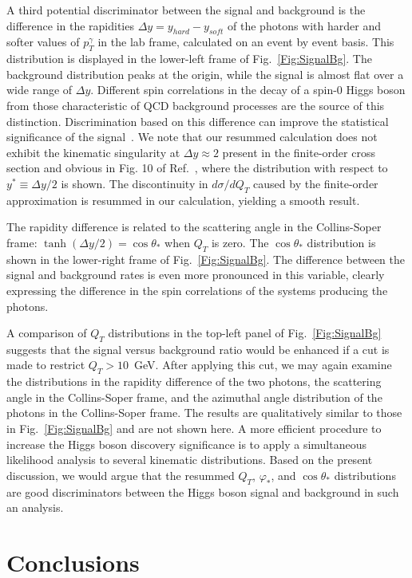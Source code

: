 \documentclass[12pt,english,aps,preprint,prd,letterpaper,fleqn,nofootinbib,showpacs,showkeys,tightenlines,floatfix]{revtex4}
\begin{document}
{A third potential discriminator between the signal and background
is the difference in the rapidities $\Delta y=y_{hard}-y_{soft}$
of the photons with harder and softer values of $p_{T}^{\gamma}$
in the lab frame, calculated on an event by event basis. This distribution
is displayed in the lower-left frame of Fig.~\ref{Fig:SignalBg}.
The background distribution peaks at the origin, while the signal
is almost flat over a wide range of $\Delta y$. Different spin correlations
in the decay of a spin-0 Higgs boson from those characteristic of
QCD background processes are the source of this distinction. Discrimination
based on this difference can improve the statistical significance
of the signal~\cite{Bern:2002jx}. We note that our resummed calculation
does not exhibit the kinematic singularity at $\Delta y\approx2$
present in the finite-order cross section and obvious in Fig. 10 
of Ref.~\cite{Bern:2002jx}, where the distribution with respect to
$y^*\equiv\Delta y/2$ is shown. The
discontinuity in $d\sigma/dQ_{T}$ caused by the finite-order approximation
is resummed in our calculation, yielding a smooth result.

The rapidity difference is related to the scattering angle in the
Collins-Soper frame: $\tanh(\Delta y/2)=\cos\theta_{*}$ when $Q_{T}$
is zero. The $\cos\theta_{*}$ distribution is shown in the lower-right
frame of Fig.~\ref{Fig:SignalBg}. The difference between the signal
and background rates is even more pronounced in this variable, clearly
expressing the difference in the spin correlations of the systems producing the
photons.

A comparison of $Q_{T}$ distributions in the top-left panel of Fig.~\ref{Fig:SignalBg}
suggests that the signal versus background ratio would be enhanced
if a cut is made to restrict $Q_{T}>10$~GeV. After applying this
cut, we may again examine the distributions in the rapidity difference
of the two photons, the scattering angle in the Collins-Soper frame,
and the azimuthal angle distribution of the photons in the Collins-Soper
frame. The results are qualitatively similar to those in Fig.~\ref{Fig:SignalBg}
and are not shown here. A more efficient procedure to increase the
Higgs boson discovery significance is to apply a simultaneous likelihood
analysis to several kinematic distributions. Based on the present
discussion, we would argue that the resummed $Q_{T}$, $\varphi_{*}$,
and $\cos\theta_{*}$ distributions are good discriminators between
the Higgs boson signal and background in such an analysis.

\section{Conclusions \label{Sec:conclusions}}

}
\end{document}

